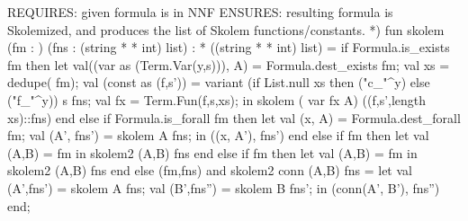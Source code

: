 REQUIRES: given formula is in NNF
ENSURES: resulting formula is Skolemized, and produces the
         list of Skolem functions/constants. *)
fun skolem (fm : ) (fns : (string *  * int) list)
  :  * ((string *  * int) list) =
  if Formula.is_exists fm
  then let val((var as (Term.Var(y,s))), A) = Formula.dest_exists fm;
           val xs = dedupe( fm);
           val (const as (f,s')) = variant (if List.null xs
                                 then ("c_"^y)
                                 else ("f_"^y))
                                s
                                fns;
           val fx = Term.Fun(f,s,xs);
       in skolem ( var fx A) ((f,s',length xs)::fns) end
  else if Formula.is_forall fm
  then let val (x, A) = Formula.dest_forall fm;
           val (A', fns') = skolem A fns;
       in ((x, A'), fns') end
  else if  fm
  then let val (A,B) =  fm
       in skolem2  (A,B) fns end
  else if  fm
  then let val (A,B) =  fm
       in skolem2  (A,B) fns end
  else (fm,fns)
and skolem2 conn (A,B) fns =
    let val (A',fns') = skolem A fns;
        val (B',fns'') = skolem B fns';
    in (conn(A', B'), fns'') end;
